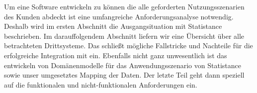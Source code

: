  \label{chap: Anforderungsanalyse}

Um eine Software entwickeln zu können die alle geforderten Nutzungsszenarien des Kunden abdeckt ist eine umfangreiche Anforderungsanalyse notwendig. Deshalb wird im ersten Abschnitt die Ausgangsituation mit Statistance beschrieben. Im darauffolgendem Abschnitt liefern wir eine Übersicht über alle betrachteten Drittsysteme. Das schließt mögliche Fallstricke und Nachteile für die erfolgreiche Integration mit ein. Ebenfalls nicht ganz unwesentlich ist das entwickeln von Domänenmodelle für das Anwendungsszenario von Statistance sowie unser umgesetztes Mapping der Daten. Der letzte Teil geht dann speziell auf die funktionalen und nicht-funktionalen Anforderungen ein.


\newpage


\newpage


\newpage


\newpage

